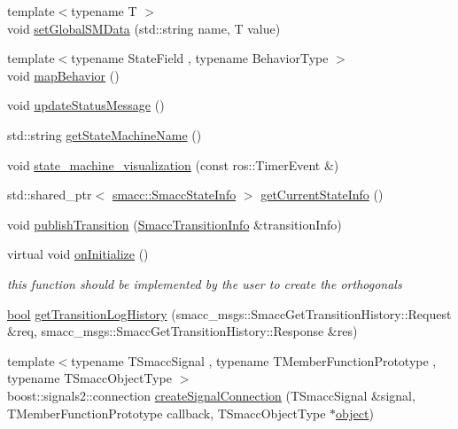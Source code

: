\begin{DoxyCompactItemize}
\item 
{\footnotesize template$<$typename T $>$ }\\void \hyperlink{classsmacc_1_1ISmaccStateMachine_a8588f9e580fbb95b53e2bd2ca3ff1f98}{set\+Global\+S\+M\+Data} (std\+::string name, T value)
\item 
{\footnotesize template$<$typename State\+Field , typename Behavior\+Type $>$ }\\void \hyperlink{classsmacc_1_1ISmaccStateMachine_acfb75233b79062cc7769ea751b7f320d}{map\+Behavior} ()
\item 
void \hyperlink{classsmacc_1_1ISmaccStateMachine_ad246a49015fadaeb0b1639d7ab99f7d0}{update\+Status\+Message} ()
\item 
std\+::string \hyperlink{classsmacc_1_1ISmaccStateMachine_a2d0b1742f17dd77d5df217153e8b5259}{get\+State\+Machine\+Name} ()
\item 
void \hyperlink{classsmacc_1_1ISmaccStateMachine_ac03029f770422d0ea77ea9856b8cb1a8}{state\+\_\+machine\+\_\+visualization} (const ros\+::\+Timer\+Event \&)
\item 
std\+::shared\+\_\+ptr$<$ \hyperlink{classsmacc_1_1SmaccStateInfo}{smacc\+::\+Smacc\+State\+Info} $>$ \hyperlink{classsmacc_1_1ISmaccStateMachine_a1c455c0f33506e59a7f4389e3fe99ffe}{get\+Current\+State\+Info} ()
\item 
void \hyperlink{classsmacc_1_1ISmaccStateMachine_ab61bff5b3c49c4bfc17972e2de8d4fd5}{publish\+Transition} (\hyperlink{structsmacc_1_1SmaccTransitionInfo}{Smacc\+Transition\+Info} \&transition\+Info)
\item 
virtual void \hyperlink{classsmacc_1_1ISmaccStateMachine_ac2982c6c8283663e5e1e8a7c82f511ec}{on\+Initialize} ()
\begin{DoxyCompactList}\small\item\em this function should be implemented by the user to create the orthogonals \end{DoxyCompactList}\item 
\hyperlink{classbool}{bool} \hyperlink{classsmacc_1_1ISmaccStateMachine_a7508f4e398e263cdce308c8074bd5151}{get\+Transition\+Log\+History} (smacc\+\_\+msgs\+::\+Smacc\+Get\+Transition\+History\+::\+Request \&req, smacc\+\_\+msgs\+::\+Smacc\+Get\+Transition\+History\+::\+Response \&res)
\item 
{\footnotesize template$<$typename T\+Smacc\+Signal , typename T\+Member\+Function\+Prototype , typename T\+Smacc\+Object\+Type $>$ }\\boost\+::signals2\+::connection \hyperlink{classsmacc_1_1ISmaccStateMachine_adf0f42ade0c65cc471960fe2a7c42da2}{create\+Signal\+Connection} (T\+Smacc\+Signal \&signal, T\+Member\+Function\+Prototype callback, T\+Smacc\+Object\+Type $\ast$\hyperlink{classobject}{object})

\end{DoxyCompactItemize}
